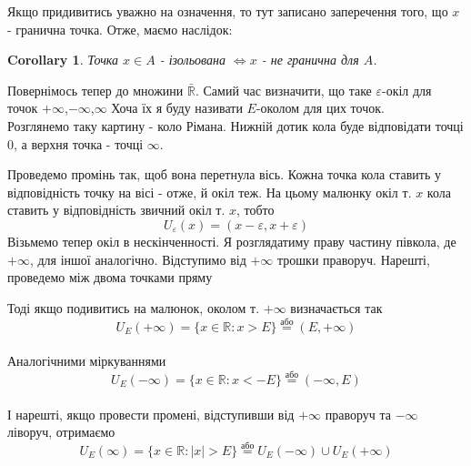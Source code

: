 \documentclass[a4paper, 14pt]{article}
\theoremstyle{theoremdd}
\theoremstyle{theoremdd}
\theoremstyle{theoremdd}
\theoremstyle{theoremdd}
\theoremstyle{theoremdd}
\theoremstyle{theoremdd}
\theoremstyle{theoremdd}
\theoremstyle{theoremdd}
\newtheorem{corollary}[theorem]{Corollary}
\begin{document}
Якщо придивитись уважно на означення, то тут записано заперечення того, що $x$ - гранична точка. Отже, маємо наслідок:
\begin{corollary}
Точка $x \in A$ - ізольована $\iff x$ - не гранична для $A$.
\end{corollary}

\iffalse
Повернімось тепер до множини $\bar{\mathbb{R}}$. Самий час визначити, що таке $\varepsilon$-окіл для точок $+\infty$,$-\infty$,$\infty$ Хоча їх я буду називати $E$-околом для цих точок.\\
Розглянемо таку картину - коло Рімана. Нижній дотик кола буде відповідати точці $0$, а верхня точка - точці $\infty$.
	\begin{figure}[H]
	\centering
	\end{figure}
	Проведемо промінь так, щоб вона перетнула вісь. Кожна точка кола ставить у відповідність точку на вісі - отже, й окіл теж. На цьому малюнку окіл т. $x$ кола ставить у відповідність звичний окіл т. $x$, тобто $$U_{\varepsilon}(x) = (x-\varepsilon,x+\varepsilon)$$
	Візьмемо тепер окіл в нескінченності. Я розглядатиму праву частину півкола, де $+\infty$, для іншої аналогічно. Відступимо від $+\infty$ трошки праворуч. Нарешті, проведемо між двома точками пряму\\
	\begin{figure}[H]
	\centering
	\resizebox{1.1\textwidth}{!} {
	}
	\end{figure}
	Тоді якщо подивитись на малюнок, околом т. $+\infty$ визначається так $$U_{E}(+\infty) = \{x \in \mathbb{R}: x > E\} \overset{\text{або}}{=} (E,+\infty)$$\\
	Аналогічними міркуваннями $$U_{E}(-\infty) = \{x \in \mathbb{R}: x < -E\} \overset{\text{або}}{=} (-\infty, E)$$\\
	І нарешті, якщо провести промені, відступивши від $+\infty$ праворуч та $-\infty$ ліворуч, отримаємо
	$$U_{E}(\infty) = \{x \in \mathbb{R}: |x| > E\} \overset{\text{або}}{=} U_{E}(-\infty) \cup U_E(+\infty) $$
	
\end{document}
